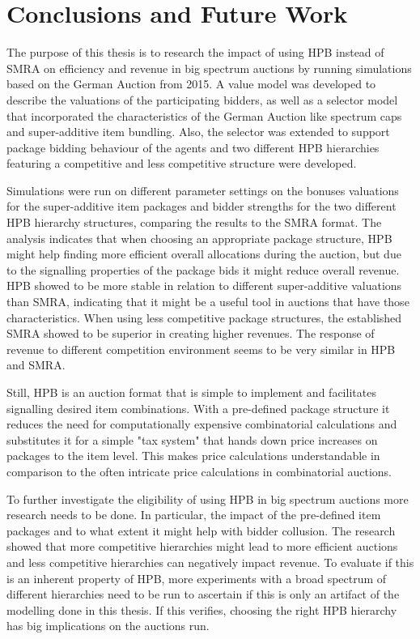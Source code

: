 
\chapter{Conclusions and Future Work}\label{chapter:conclusion}
The purpose of this thesis is to research the impact of using HPB instead of SMRA on efficiency and revenue in big spectrum auctions by running simulations based on the German Auction from 2015. A value model was developed to describe the valuations of the participating bidders, as well as a selector model that incorporated the characteristics of the German Auction like spectrum caps and super-additive item bundling. Also, the selector was extended to support package bidding behaviour of the agents and two different HPB hierarchies featuring a competitive and less competitive structure were developed.

Simulations were run on different parameter settings on the bonuses valuations for the super-additive item packages and bidder strengths for the two different HPB hierarchy structures,  comparing the results to the SMRA format. The analysis indicates that when choosing an appropriate package structure, HPB might help finding more efficient overall allocations during the auction, but due to the signalling properties of the package bids it might reduce overall revenue. HPB showed to be more stable in relation to different super-additive valuations than SMRA, indicating that it might be a useful tool in auctions that have those characteristics. When using less competitive package structures, the established SMRA showed to be superior in creating higher revenues. The response of revenue to different competition environment seems to be very similar in HPB and SMRA.

Still, HPB is an auction format that is simple to implement and facilitates signalling desired item combinations. With a pre-defined package structure it reduces the need for computationally expensive combinatorial calculations and substitutes it for a simple "tax system" that hands down price increases on packages to the item level. This makes price calculations understandable in comparison to the often intricate price calculations in combinatorial auctions.

To further investigate the eligibility of using HPB in big spectrum auctions more research needs to be done. In particular, the impact of the pre-defined item packages and to what extent it might help with bidder collusion. The research showed that more competitive hierarchies might lead to more efficient auctions and less competitive hierarchies can negatively impact revenue. To evaluate if this is an inherent property of HPB, more experiments with a broad spectrum of different hierarchies need to be run to ascertain if this is only an artifact of the modelling done in this thesis. If this verifies, choosing the right HPB hierarchy has big implications on the auctions run.

